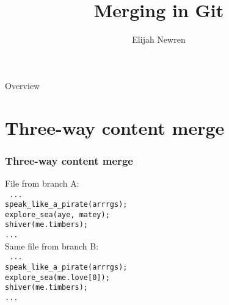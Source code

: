 \documentclass[t]{beamer}
\title{Merging in Git}
\author{Elijah Newren}
\institute{}
\date{}
\begin{document}
\begin{frame}
  \titlepage
\end{frame}

\begin{frame}{Overview}
  \tableofcontents
\end{frame}


\section{Three-way content merge}

\begin{frame}
  \frametitle{Three-way content merge}

  \begin{multicols}{2}
    File from branch A:\\
    {\footnotesize\texttt{%
    ...                             \\
    speak\_like\_a\_pirate(arrrgs); \\
    explore\_sea(aye, matey);\\
    shiver(me.timbers);             \\
    ...                             \\
    }}
    \columnbreak
    \pause
    Same file from branch B:\\
    {\footnotesize\texttt{%
    ...                             \\
    speak\_like\_a\_pirate(arrrgs); \\
    explore\_sea(me.love[0]);\\
    shiver(me.timbers);             \\
    ...
    }}
  \end{multicols}%

\end{frame}
\end{document}
